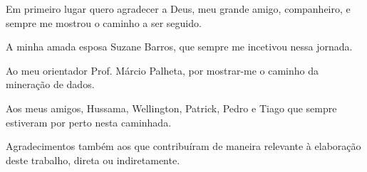 \documentclass[
	12pt,				%
	openright,			%
	oneside,	
	a4paper,				%
	english,				%
	brazil				%
]{abntex2/abntex2} %
\begin{document}

\begin{agradecimentos}
\begin{SingleSpace}
Em primeiro lugar quero agradecer a Deus, meu grande amigo, companheiro, e sempre me mostrou o caminho a ser seguido.

A minha  amada esposa Suzane Barros, que sempre me incetivou nessa jornada.

Ao meu orientador Prof. Márcio Palheta, por mostrar-me o caminho da mineração de dados.

Aos meus amigos, Hussama, Wellington, Patrick, Pedro e Tiago que sempre estiveram por perto nesta caminhada.

Agradecimentos também aos que contribuíram de maneira relevante à elaboração deste trabalho, direta ou indiretamente.
\end{SingleSpace}
\end{agradecimentos}






\end{document}
